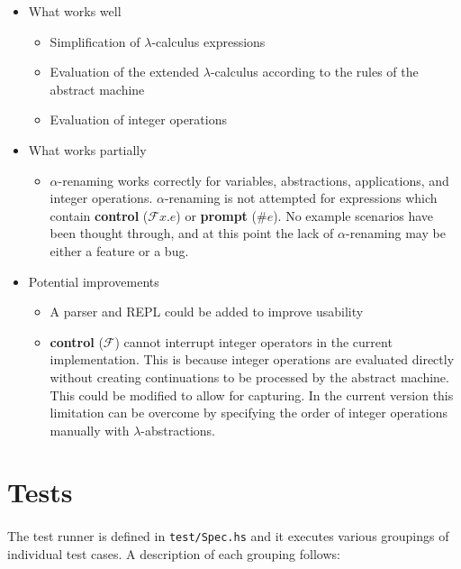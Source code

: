 \documentclass{article}
\begin{document}
\begin{itemize}
\item What works well
  \begin{itemize}
  \item Simplification of $\lambda$-calculus expressions
  \item Evaluation of the extended $\lambda$-calculus according to the rules of the abstract machine
  \item Evaluation of integer operations
  \end{itemize}
\item What works partially
  \begin{itemize}
  \item $\alpha$-renaming works correctly for variables, abstractions, applications, and integer operations. $\alpha$-renaming is not attempted for expressions which contain \textbf{control} ($\mathcal{F}x.e$) or \textbf{prompt} ($\#e$). No example scenarios have been thought through, and at this point the lack of $\alpha$-renaming may be either a feature or a bug.
  \end{itemize}
\item Potential improvements
  \begin{itemize}
  \item A parser and REPL could be added to improve usability
  \item \textbf{control} ($\mathcal{F}$) cannot interrupt integer operators in the current implementation. This is because integer operations are evaluated directly without creating continuations to be processed by the abstract machine. This could be modified to allow for capturing. In the current version this limitation can be overcome by specifying the order of integer operations manually with $\lambda$-abstractions.
  \end{itemize}
\end{itemize}

\section*{Tests}

\paragraph{}
The test runner is defined in \texttt{test/Spec.hs} and it executes various groupings of individual test cases. A description of each grouping follows:
\end{document}
